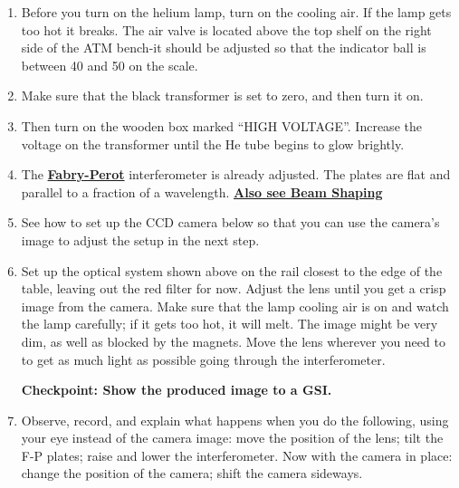 \documentclass{../lab}
\begin{document}
\begin{enumerate}
    \item Before you turn on the helium lamp, turn on the cooling air. If the lamp gets too hot it breaks. The air valve is located above the top shelf on the right side of the ATM bench-it should be adjusted so that the indicator ball is between 40 and 50 on the scale.

    \item Make sure that the black transformer is set to zero, and then turn it on.

    \item Then turn on the wooden box marked ``HIGH VOLTAGE''. Increase the voltage on the transformer until the He tube begins to glow brightly.

    \item The \href{http://physics111.lib.berkeley.edu/Physics111/Reprints/ATM/OCR\%20Burleigh\%20tech\%20memo\%20fabry\%20perots.pdf}{\textbf{Fabry-Perot}} interferometer is already adjusted. The plates are flat and parallel to a fraction of a wavelength. \href{http://physics111.lib.berkeley.edu/Physics111/Reprints/ATM/Beam\%20Shaping.pdf}{\textbf{Also see Beam Shaping}}

    \item See how to set up the CCD camera below so that you can use the camera's image to adjust the setup in the next step.

    \item Set up the optical system shown above on the rail closest to the edge of the table, leaving out the red filter for now. Adjust the lens until you get a crisp image from the camera. Make sure that the lamp cooling air is on and watch the lamp carefully; if it gets too hot, it will melt. The image might be very dim, as well as blocked by the magnets. Move the lens wherever you need to to get as much light as possible going through the interferometer.
    
    \textbf{Checkpoint: Show the produced image to a GSI.}

    \item Observe, record, and explain what happens when you do the following, using your eye instead of the camera image: move the position of the lens; tilt the F-P plates; raise and lower the interferometer. Now with the camera in place: change the position of the camera; shift the camera sideways.


\end{enumerate}
\end{document}
